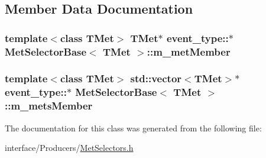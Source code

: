 \subsection{Member Data Documentation}
\hypertarget{classMetSelectorBase_a2eaea4fc8ec9c76234347ada082c5f9d}{
\subsubsection[{m\_\-metMember}]{\setlength{\rightskip}{0pt plus 5cm}template$<$class TMet$>$ TMet$\ast$ event\_\-type::$\ast$ {\bf MetSelectorBase}$<$ TMet $>$::{\bf m\_\-metMember}}}
\label{classMetSelectorBase_a2eaea4fc8ec9c76234347ada082c5f9d}
\hypertarget{classMetSelectorBase_a035fd3acacfd2f9a20f110d2134aa85f}{
\subsubsection[{m\_\-metsMember}]{\setlength{\rightskip}{0pt plus 5cm}template$<$class TMet$>$ std::vector$<$TMet$>$$\ast$ event\_\-type::$\ast$ {\bf MetSelectorBase}$<$ TMet $>$::{\bf m\_\-metsMember}}}
\label{classMetSelectorBase_a035fd3acacfd2f9a20f110d2134aa85f}


The documentation for this class was generated from the following file:\begin{DoxyCompactItemize}
\item 
interface/Producers/\hyperlink{MetSelectors_8h}{MetSelectors.h}\end{DoxyCompactItemize}

